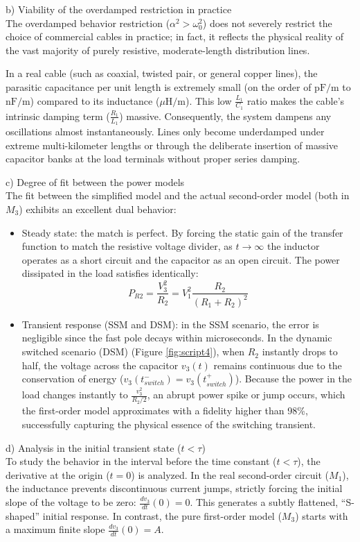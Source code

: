 \documentclass[energies,accept,oneauthor,pdftex]{Definitions/mdpi}
\begin{document}
\medskip\noindent
b) Viability of the overdamped restriction in practice\\
The overdamped behavior restriction ($\alpha^2 > \omega_0^2$) does not severely restrict the choice of commercial cables in practice; in fact, it reflects the physical reality of the vast majority of purely resistive, moderate-length distribution lines.

In a real cable (such as coaxial, twisted pair, or general copper lines), the parasitic capacitance per unit length is extremely small (on the order of $\text{pF/m}$ to $\text{nF/m}$) compared to its inductance ($\mu\text{H/m}$). This low $\frac{L_1}{C_1}$ ratio makes the cable's intrinsic damping term ($\frac{R_1}{L_1}$) massive. Consequently, the system dampens any oscillations almost instantaneously. Lines only become underdamped under extreme multi-kilometer lengths or through the deliberate insertion of massive capacitor banks at the load terminals without proper series damping.

\medskip\noindent
c) Degree of fit between the power models\\
The fit between the simplified model and the actual second-order model (both in $M_3$) exhibits an excellent dual behavior:
\begin{itemize}
    \item Steady state: the match is perfect. By forcing the static gain of the transfer function to match the resistive voltage divider, as $t \to \infty$ the inductor operates as a short circuit and the capacitor as an open circuit. The power dissipated in the load satisfies identically:
    \[ P_{R2} = \frac{V_3^2}{R_2} = V_1^2 \frac{R_2}{(R_1 + R_2)^2} \]
    \item Transient response (SSM and DSM): in the SSM scenario, the error is negligible since the fast pole decays within microseconds. In the dynamic switched scenario (DSM) (Figure \ref{fig:script4}), when $R_2$ instantly drops to half, the voltage across the capacitor $v_3(t)$ remains continuous due to the conservation of energy ($v_3(t_{switch}^-) = v_3(t_{switch}^+)$). Because the power in the load changes instantly to $\frac{v_3^2}{R_2/2}$, an abrupt power spike or jump occurs, which the first-order model approximates with a fidelity higher than 98\%, successfully capturing the physical essence of the switching transient.
\end{itemize}

\medskip\noindent
d) Analysis in the initial transient state ($t < \tau$) \\
To study the behavior in the interval before the time constant ($t < \tau$), the derivative at the origin ($t=0$) is analyzed.
In the real second-order circuit ($M_1$), the inductance prevents discontinuous current jumps, strictly forcing the initial slope of the voltage to be zero: $\frac{dv_3}{dt}(0) = 0$. This generates a subtly flattened, ``S-shaped'' initial response. In contrast, the pure first-order model ($M_3$) starts with a maximum finite slope $\frac{dv_3}{dt}(0) = A$.
\end{document}
